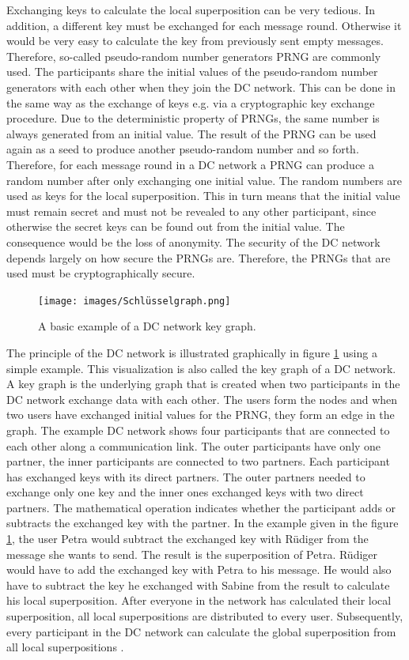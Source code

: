 Exchanging keys to calculate the local superposition can be very tedious. In addition, a different key must be exchanged for each message round. Otherwise it would be very easy to calculate the key from previously sent empty messages. Therefore, so-called pseudo-random number generators \gls{PRNG} are commonly used. The participants share the initial values of the pseudo-random number generators with each other when they join the DC network. This can be done in the same way as the exchange of keys e.g. via a cryptographic key exchange procedure. Due to the deterministic property of \gls{PRNG}s, the same number is always generated from an initial value. The result of the \gls{PRNG} can be used again as a seed to produce another pseudo-random number and so forth. Therefore, for each message round in a DC network a \gls{PRNG} can produce a random number after only exchanging one initial value. The random numbers are used as keys for the local superposition. This in turn means that the initial value must remain secret and must not be revealed to any other participant, since otherwise the secret keys can be found out from the initial value. The consequence would be the loss of anonymity. The security of the DC network depends largely on how secure the \gls{PRNG}s are. Therefore, the \gls{PRNG}s that are used must be cryptographically secure.\\
\begin{figure}[tbp]
  \centering
  \texttt{[image: images/Schlüsselgraph.png]}
  \caption[DC Network Key Graph]{A basic example of a DC network key graph\cite{stephan_escher}.}
  \label{fig:keygraph}
\end{figure} The principle of the DC network is illustrated graphically in figure \ref{fig:keygraph} using a simple example. This visualization is also called the key graph of a DC network. A key graph is the underlying graph that is created when two participants in the DC network exchange data with each other. The users form the nodes and when two users have exchanged initial values for the \gls{PRNG}, they form an edge in the graph. The example DC network shows four participants that are connected to each other along a communication link. The outer participants have only one partner, the inner participants are connected to two partners. Each participant has exchanged keys with its direct partners. The outer partners needed to exchange only one key and the inner ones exchanged keys with two direct partners.
The mathematical operation indicates whether the participant adds or subtracts the exchanged key with the partner. In the example given in the figure \ref{fig:keygraph}, the user Petra would subtract the exchanged key with Rüdiger from the message she wants to send. The result is the superposition of Petra. Rüdiger would have to add the exchanged key with Petra to his message. He would also have to subtract the key he exchanged with Sabine from the result to calculate his local superposition. After everyone in the network has calculated their local superposition, all local superpositions are distributed to every user. Subsequently, every participant in the DC network can calculate the global superposition from all local superpositions \cite{stephan_escher}\cite{pfitzmann2006security}.

